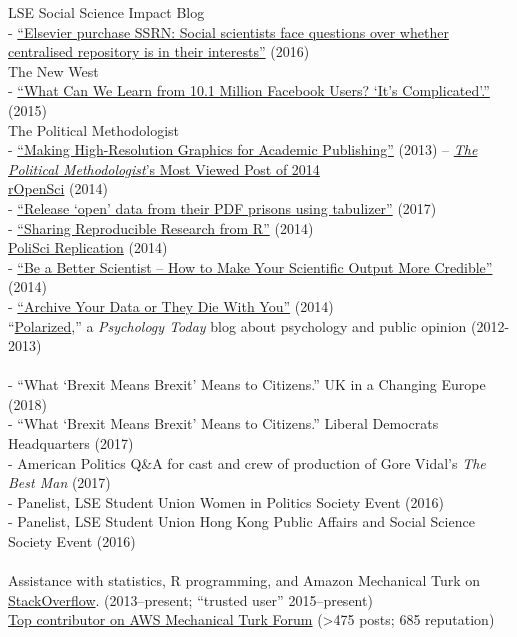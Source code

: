 \documentclass[12pt]{article}
\newcommand{\topic}[1]{\pagebreak[3]\indent {\color{lg}{\footnotesize #1 }}\\}
\newcommand{\entry}[1]{\indent {\color{lg}\guillemotright}\hspace{2pt}#1\vspace{.25em}\\}
\newcommand{\subentry}[1]{{\color{lg}-} #1\vspace{.25em}\\}
\begin{document}
		\entry{LSE Social Science Impact Blog}
			\subentry{\href{http://blogs.lse.ac.uk/impactofsocialsciences/2016/05/18/elsevier-purchase-ssrn-social-scientists-face-questions-over-whether-centralised-repository-is-in-their-interests/}{``Elsevier purchase SSRN: Social scientists face questions over whether centralised repository is in their interests''} (2016)}
		\entry{The New West}
			\subentry{\href{https://thewpsa.wordpress.com/2015/05/09/what-can-we-learn-from-10-1-million-facebook-users-its-complicated/}{``What Can We Learn from 10.1 Million Facebook Users? `It's Complicated'.''} (2015)}
		\entry{The Political Methodologist}
			\subentry{\href{https://thepoliticalmethodologist.com/2013/11/25/making-high-resolution-graphics-for-academic-publishing/}{``Making High-Resolution Graphics for Academic Publishing''} (2013) -- \href{http://thepoliticalmethodologist.com/2015/01/05/introducing-the-annual-tpm-most-viewed-post-award-and-our-2014-winner/}{\textit{The Political Methodologist}'s Most Viewed Post of 2014}}
		\entry{\href{http://ropensci.org/blog/}{rOpenSci} (2014)}
			\subentry{\href{https://ropensci.org/blog/2017/04/18/tabulizer/}{``Release `open' data from their PDF prisons using tabulizer''} (2017)}
            \subentry{\href{https://ropensci.org/blog/2014/02/20/dvn-dataverse-network/}{``Sharing Reproducible Research from R''} (2014)}
		\entry{\href{http://politicalsciencereplication.wordpress.com/}{PoliSci Replication} (2014)}
			\subentry{\href{https://politicalsciencereplication.wordpress.com/2014/06/04/guest-post-be-a-better-scientist-how-to-make-your-scientific-output-more-credible-by-thomas-leeper/}{``Be a Better Scientist -- How to Make Your Scientific Output More Credible''} (2014)}
			\subentry{\href{https://politicalsciencereplication.wordpress.com/2014/05/21/guest-post-why-reproducibility-requires-data-archiving-by-thomas-leeper/}{``Archive Your Data or They Die With You''} (2014)}
		\entry{``\href{http://www.psychologytoday.com/blog/polarized}{Polarized},'' a \textit{Psychology Today} blog about psychology and public opinion (2012-2013)}
	
	\topic{Public and non-academic presentations}
		\subentry{``What `Brexit Means Brexit' Means to Citizens.'' UK in a Changing Europe (2018)}
        \subentry{``What `Brexit Means Brexit' Means to Citizens.'' Liberal Democrats Headquarters (2017)}
        \subentry{American Politics Q\&A for cast and crew of production of Gore Vidal's \textit{The Best Man} (2017)}
        \subentry{Panelist, LSE Student Union Women in Politics Society Event (2016)}
        \subentry{Panelist, LSE Student Union Hong Kong Public Affairs and Social Science Society Event (2016)}

	\topic{Miscellaneous}
		\entry{Assistance with statistics, R programming, and Amazon Mechanical Turk on \href{http://stackoverflow.com/users/2338862/thomas}{StackOverflow}. (2013--present; ``trusted user'' 2015--present)}
        \entry{\href{https://forums.aws.amazon.com/profile.jspa?userID=187779}{Top contributor on AWS Mechanical Turk Forum} (>475 posts; 685 reputation)}
\end{document}
